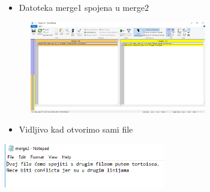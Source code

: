 \documentclass[10pt]{beamer}
\begin{document}
\begin{frame}
\begin{itemize}
    \item\small{Datoteka merge1 spojena u merge2}
\end{itemize}
\includegraphics[height=4cm, width=10cm]{tortoise2.png}\newline
\begin{itemize}
    \item\small{Vidljivo kad otvorimo sami file}
\end{itemize}
\includegraphics[width=7cm]{tortoise3.png}
\end{frame}
\end{document}
